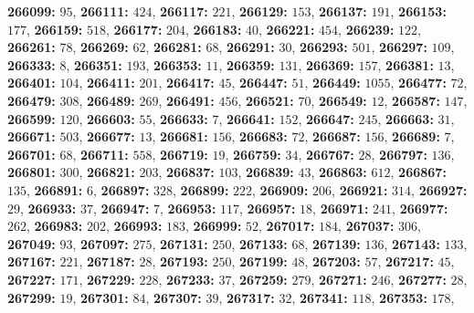 \textsf{\bfseries 266099:} $95$, \textsf{\bfseries 266111:} $424$, \textsf{\bfseries 266117:} $221$, \textsf{\bfseries 266129:} $153$, \textsf{\bfseries 266137:} $191$, \textsf{\bfseries 266153:} $177$, \textsf{\bfseries 266159:} $518$, \textsf{\bfseries 266177:} $204$, \textsf{\bfseries 266183:} $40$, \textsf{\bfseries 266221:} $454$, \textsf{\bfseries 266239:} $122$, \textsf{\bfseries 266261:} $78$, \textsf{\bfseries 266269:} $62$, \textsf{\bfseries 266281:} $68$, \textsf{\bfseries 266291:} $30$, \textsf{\bfseries 266293:} $501$, \textsf{\bfseries 266297:} $109$, \textsf{\bfseries 266333:} $8$, \textsf{\bfseries 266351:} $193$, \textsf{\bfseries 266353:} $11$, \textsf{\bfseries 266359:} $131$, \textsf{\bfseries 266369:} $157$, \textsf{\bfseries 266381:} $13$, \textsf{\bfseries 266401:} $104$, \textsf{\bfseries 266411:} $201$, \textsf{\bfseries 266417:} $45$, \textsf{\bfseries 266447:} $51$, \textsf{\bfseries 266449:} $1055$, \textsf{\bfseries 266477:} $72$, \textsf{\bfseries 266479:} $308$, \textsf{\bfseries 266489:} $269$, \textsf{\bfseries 266491:} $456$, \textsf{\bfseries 266521:} $70$, \textsf{\bfseries 266549:} $12$, \textsf{\bfseries 266587:} $147$, \textsf{\bfseries 266599:} $120$, \textsf{\bfseries 266603:} $55$, \textsf{\bfseries 266633:} $7$, \textsf{\bfseries 266641:} $152$, \textsf{\bfseries 266647:} $245$, \textsf{\bfseries 266663:} $31$, \textsf{\bfseries 266671:} $503$, \textsf{\bfseries 266677:} $13$, \textsf{\bfseries 266681:} $156$, \textsf{\bfseries 266683:} $72$, \textsf{\bfseries 266687:} $156$, \textsf{\bfseries 266689:} $7$, \textsf{\bfseries 266701:} $68$, \textsf{\bfseries 266711:} $558$, \textsf{\bfseries 266719:} $19$, \textsf{\bfseries 266759:} $34$, \textsf{\bfseries 266767:} $28$, \textsf{\bfseries 266797:} $136$, \textsf{\bfseries 266801:} $300$, \textsf{\bfseries 266821:} $203$, \textsf{\bfseries 266837:} $103$, \textsf{\bfseries 266839:} $43$, \textsf{\bfseries 266863:} $612$, \textsf{\bfseries 266867:} $135$, \textsf{\bfseries 266891:} $6$, \textsf{\bfseries 266897:} $328$, \textsf{\bfseries 266899:} $222$, \textsf{\bfseries 266909:} $206$, \textsf{\bfseries 266921:} $314$, \textsf{\bfseries 266927:} $29$, \textsf{\bfseries 266933:} $37$, \textsf{\bfseries 266947:} $7$, \textsf{\bfseries 266953:} $117$, \textsf{\bfseries 266957:} $18$, \textsf{\bfseries 266971:} $241$, \textsf{\bfseries 266977:} $262$, \textsf{\bfseries 266983:} $202$, \textsf{\bfseries 266993:} $183$, \textsf{\bfseries 266999:} $52$, \textsf{\bfseries 267017:} $184$, \textsf{\bfseries 267037:} $306$, \textsf{\bfseries 267049:} $93$, \textsf{\bfseries 267097:} $275$, \textsf{\bfseries 267131:} $250$, \textsf{\bfseries 267133:} $68$, \textsf{\bfseries 267139:} $136$, \textsf{\bfseries 267143:} $133$, \textsf{\bfseries 267167:} $221$, \textsf{\bfseries 267187:} $28$, \textsf{\bfseries 267193:} $250$, \textsf{\bfseries 267199:} $48$, \textsf{\bfseries 267203:} $57$, \textsf{\bfseries 267217:} $45$, \textsf{\bfseries 267227:} $171$, \textsf{\bfseries 267229:} $228$, \textsf{\bfseries 267233:} $37$, \textsf{\bfseries 267259:} $279$, \textsf{\bfseries 267271:} $246$, \textsf{\bfseries 267277:} $28$, \textsf{\bfseries 267299:} $19$, \textsf{\bfseries 267301:} $84$, \textsf{\bfseries 267307:} $39$, \textsf{\bfseries 267317:} $32$, \textsf{\bfseries 267341:} $118$, \textsf{\bfseries 267353:} $178$, 
